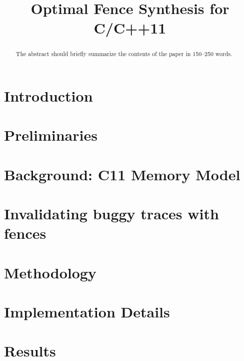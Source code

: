 \documentclass[runningheads]{llncs2e/llncs}
\begin{document}
%
\title{Optimal Fence Synthesis for C/C++11}
%
%
\maketitle              %
%
\begin{abstract}
The abstract should briefly summarize the contents of the paper in
150--250 words.

\end{abstract}
%
%
%
\section{Introduction} \label{sec:intro}


\section{Preliminaries} \label{sec:preliminaries}


\section{Background: C11 Memory Model} \label{sec:c11}


\section{Invalidating buggy traces with \cc fences} \label{sec:invalidating ce}


\section{Methodology} \label{sec:methodology}


\section{Implementation Details} \label{sec:implementation}


\section{Results} \label{sec:results}

\end{document}
